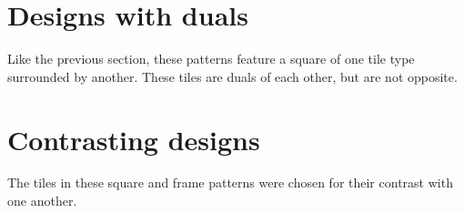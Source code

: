 \documentclass{tufte-book}
\begin{document}
\section{Designs with duals}
Like the previous section, these patterns feature a square of one tile type surrounded by another. These tiles are duals of each other, but are not opposite.
{
\setlength{\tabcolsep}{0pt}
\renewcommand{\arraystretch}{0}

}

\section{Contrasting designs}
The tiles in these square and frame patterns were chosen for their contrast with one another.
{
\setlength{\tabcolsep}{0pt}
\renewcommand{\arraystretch}{0}

}
\backmatter
\nocite{*}


\end{document}
